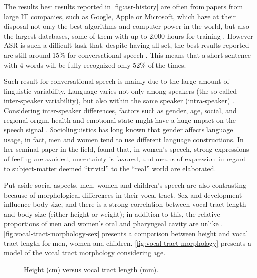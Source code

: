 The results best results reported in \autoref{fig:asr-history} are often from papers from large IT companies, such as Google, Apple or Microsoft, which have at their disposal not only the best algorithms and computer power in the world, but also the largest databases, some of them with up to 2,000 hours for training \cite{Huang2014}. However \ac{ASR} is such a difficult task that, despite having all set, the best results reported are still around 15\% for conversational speech  \cite{Huang2014}. This means that a short sentence with 4 words will be fully recognized only 52\% of the times. 

Such result for conversational speech is mainly due to the large amount of linguistic variability. Language varies not only among speakers (the so-called inter-speaker variability), but also within the same speaker (intra-speaker) \citep{Benzeghiba2007}.  Considering inter-speaker differences, factors such as gender, age, social, and regional 
origin, health and emotional state might have a huge impact on the speech signal \citep{Benzeghiba2007}.
Sociolinguistics has long known that gender affects language usage, in fact, men and women tend to use different language constructions.
In her seminal paper in the field, \citet{Lakoff1973} \citep{Lakoff1973} found that, in women's speech, strong expressions 
of feeling are avoided, uncertainty is favored, and means of expression in regard to subject-matter deemed ``trivial'' to the 
``real'' world are elaborated. 

Put aside social aspects, men, women and children's speech are also contrasting because of morphological differences
in their vocal tract. Sex and development influence body size, and there is a strong correlation between vocal tract length and body size 
(either height or weight); in addition to this, the relative proportions of men and women's oral and pharyngeal cavity are unlike 
\cite{Fitch1999}. \autoref{fig:vocal-tract-morphology-sex} presents a comparison between height and
vocal tract length for men, women and children. \autoref{fig:vocal-tract-morphology} presents a model of the vocal tract morphology considering
age.

\begin{figure}[!ht]
        \noindent{}
        \caption{Height (cm) versus vocal tract length (mm).}
        \label{fig:vocal-tract-morphology-sex}
\end{figure}

